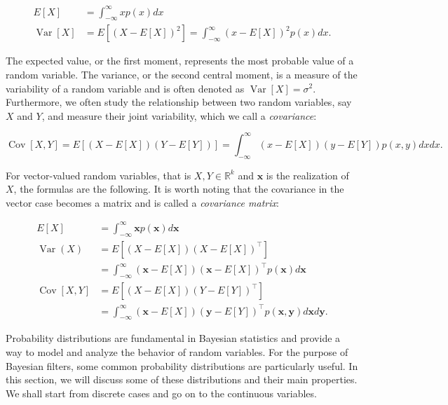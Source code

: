$$
\begin{aligned}
E[X]&=\int_{-\infty}^{\infty} x p(x) d x \\
\operatorname{Var}[X]
    &= E\left[(X-E[X])^2\right]
    =\int_{-\infty}^{\infty}(x-E[X])^2 p(x) d x.
\end{aligned}
$$

The expected value, or the first moment, represents the most probable value of
a random variable. The variance, or the second central moment, is a measure of the
variability of a random variable and is often denoted as $\operatorname{Var}[X] = \sigma^2$.
Furthermore, we often study the relationship between two random variables, say $X$ and
$Y$, and measure their joint variability, which we call a \textit{covariance}:

$$
\operatorname{Cov}[X, Y]
    = E\left[(X-E[X])(Y-E[Y])\right]
    =\int_{-\infty}^{\infty}(x-E[X])(y-E[Y]) p(x, y) d x d x.
$$

For vector-valued random variables, that is $X, Y \in \mathbb{R}^k$ and $\mathbf{x}$
is the realization of $X$, the formulas are the following. It is worth noting that
the covariance in the vector case becomes a matrix and is called a \textit{covariance
matrix}:

$$
\begin{aligned}
E[X]
    &=\int_{-\infty}^{\infty} \mathbf{x} p(\mathbf{x}) d \mathbf{x} \\
\operatorname{Var}(X)
    &= E\left[\left(X-E[X]\right)\left(X-E[X]\right)^\intercal\right]
    \\&=\int_{-\infty}^{\infty}
        \left(\mathbf{x}-E[X]\right)
        \left(\mathbf{x}-E[X]\right)^\intercal
        p(\mathbf{x})
        d \mathbf{x} \\
\operatorname{Cov}[X, Y]
    &= E\left[\left(X-E[X]\right)\left(Y-E[Y]\right)^\intercal\right]
    \\&=\int_{-\infty}^{\infty}
        \left(\mathbf{x}-E[X]\right)
        \left(\mathbf{y}-E[Y]\right)^\intercal
        p(\mathbf{x}, \mathbf{y})
        d \mathbf{x} d \mathbf{y}.
\end{aligned}
$$

Probability distributions are fundamental in Bayesian statistics and
provide a way to model and analyze the behavior of random variables. For
the purpose of Bayesian filters, some common probability distributions
are particularly useful. In this section, we will discuss some of these
distributions and their main properties. We shall start from discrete
cases and go on to the continuous variables.  %

